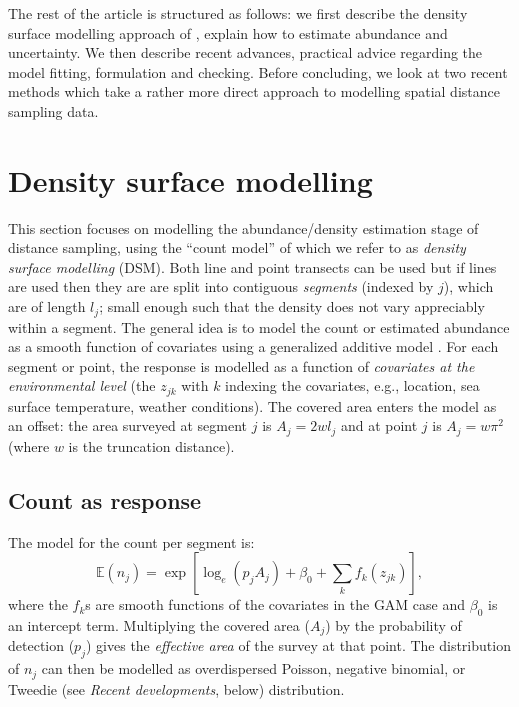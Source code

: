 \documentclass[a4paper,12pt]{article}
\begin{document}
The rest of the article is structured as follows: we first describe the density surface modelling approach of \cite{Hedley:2004et}, explain how to estimate abundance and uncertainty. We then describe recent advances, practical advice regarding the model fitting, formulation and checking. Before concluding, we look at two recent methods which take a rather more direct approach to modelling spatial distance sampling data.


\section*{Density surface modelling}
\label{s:dsm}

This section focuses on modelling the abundance/density estimation stage of distance sampling, using the ``count model'' of \cite{Hedley:2004et} which we refer to as \textit{density surface modelling} (DSM). Both line and point transects can be used but if lines are used then they are are split into contiguous \textit{segments} (indexed by $j$), which are of length $l_j$; small enough such that the density does not vary appreciably within a segment. The general idea is to model the count or estimated abundance as a smooth function of covariates using a generalized additive model \cite[GAM;][]{Wood:2006wz}. For each segment or point, the response is modelled as a function of \textit{covariates at the environmental level} (the $z_{jk}$ with $k$ indexing the covariates, e.g., location, sea surface temperature, weather conditions). The covered area enters the model as an offset: the area surveyed at segment $j$ is $A_j = 2wl_j$ and at point $j$ is $A_j=w\pi^2$ (where $w$ is the truncation distance). 

\subsection*{Count as response}

The model for the count per segment is:
\begin{equation*}
\mathbb{E}(n_j) = \exp\left[ \log_e \left( p_jA_j \right) + \beta_0 + \sum_k f_k\left(z_{jk}\right) \right],
\end{equation*}
where the $f_k$s are smooth functions of the covariates in the GAM case and $\beta_0$ is an intercept term. Multiplying the covered area ($A_j$) by the probability of detection ($p_j$) gives the \textit{effective area} of the survey at that point. The distribution of $n_j$ can then be modelled as overdispersed Poisson, negative binomial, or Tweedie (see \textit{Recent developments}, below) distribution.
\end{document}
